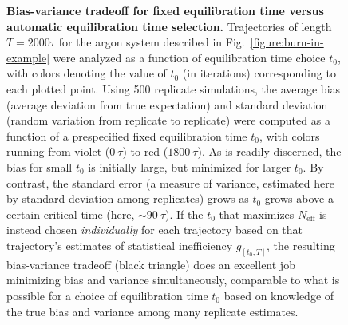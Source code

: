 \documentclass[aps,pre,twocolumn,nofootinbib,superscriptaddress,linenumbers,11point]{revtex4-1}
\begin{document}

\begin{figure}[tbp]
\caption{\label{figure:bias-variance} {\bf Bias-variance tradeoff for fixed equilibration time versus automatic equilibration time selection.} 
Trajectories of length $T = 2000 \tau$ for the argon system described in Fig.~\ref{figure:burn-in-example} were analyzed as a function of equilibration time choice $t_0$, with colors denoting the value of $t_0$ (in iterations) corresponding to each plotted point.
Using 500 replicate simulations, the average bias (average deviation from true expectation) and standard deviation (random variation from replicate to replicate) were computed as a function of a prespecified fixed equilibration time $t_0$, with colors running from violet ($0~\tau$)  to red ($1800~\tau$).
As is readily discerned, the bias for small $t_0$ is initially large, but minimized for larger $t_0$.
By contrast, the standard error (a measure of variance, estimated here by standard deviation among replicates) grows as $t_0$ grows above a certain critical time (here, $\sim 90~\tau$).
If the $t_0$ that maximizes $N_\mathrm{eff}$ is instead chosen \emph{individually} for each trajectory based on that trajectory's estimates of statistical inefficiency $g_{[t_0,T]}$, the resulting bias-variance tradeoff (black triangle) does an excellent job minimizing bias and variance simultaneously, comparable to what is possible for a choice of equilibration time $t_0$ based on knowledge of the true bias and variance among many replicate estimates.
}
\end{figure}
\end{document}
